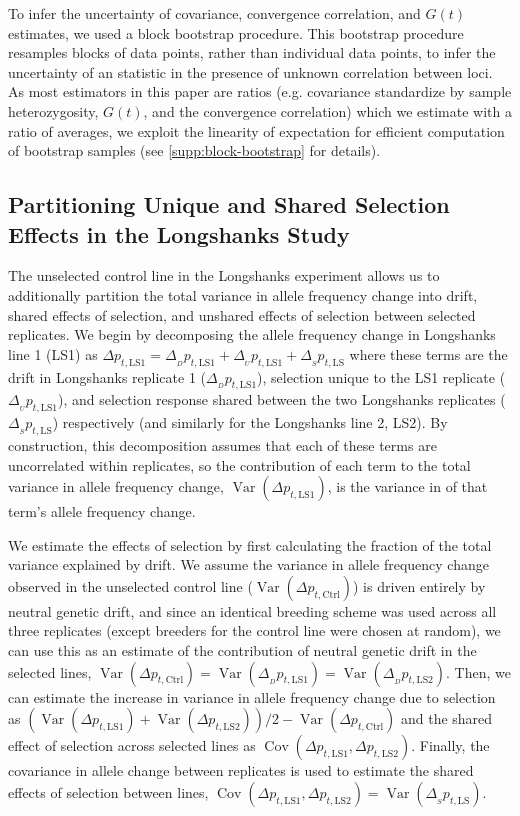 \documentclass[11pt]{article}
\DeclareMathOperator{\var}{Var}
\DeclareMathOperator{\cov}{Cov}
\begin{document}
To infer the uncertainty of covariance, convergence correlation, and $G(t)$
estimates, we used a block bootstrap procedure. This bootstrap procedure
resamples blocks of data points, rather than individual data points, to infer
the uncertainty of an statistic in the presence of unknown correlation between
loci. As most estimators in this paper are ratios (e.g. covariance standardize
by sample heterozygosity, $G(t)$, and the convergence correlation) which we
estimate with a ratio of averages, we exploit the linearity of expectation for
efficient computation of bootstrap samples (see \ref{supp:block-bootstrap} for
details).

\subsection{Partitioning Unique and Shared Selection Effects in the Longshanks Study}
\label{sec:mm-partition}

The unselected control line in the Longshanks experiment allows us to
additionally partition the total variance in allele frequency change into
drift, shared effects of selection, and unshared effects of selection between
selected replicates. We begin by decomposing the allele frequency change in
Longshanks line 1 (LS1) as $\Delta p_{t,\mathrm{LS1}} = \Delta_{_{D}}
p_{t,\mathrm{LS1}} + \Delta_{_{U}} p_{t,\mathrm{LS1}} + \Delta_{_S}
p_{t,\mathrm{LS}}$ where these terms are the drift in Longshanks replicate 1
($\Delta_{_D} p_{t,\mathrm{LS1}}$), selection unique to the LS1 replicate
($\Delta_{_U} p_{t,\mathrm{LS1}}$), and selection response shared between the
two Longshanks replicates ($\Delta_{_S} p_{t,\mathrm{LS}}$) respectively (and
similarly for the Longshanks line 2, LS2). By construction, this decomposition
assumes that each of these terms are uncorrelated within replicates, so the
contribution of each term to the total variance in allele frequency change,
$\var(\Delta p_{t,\mathrm{LS1}})$, is the variance in of that term's allele
frequency change. 

We estimate the effects of selection by first calculating the fraction of the
total variance explained by drift. We assume the variance in allele frequency
change observed in the unselected control line ($\var(\Delta
p_{t,\mathrm{Ctrl}})$) is driven entirely by neutral genetic drift, and since
an identical breeding scheme was used across all three replicates (except
breeders for the control line were chosen at random), we can use this as an
estimate of the contribution of neutral genetic drift in the selected lines,
$\var(\Delta p_{t,\mathrm{Ctrl}}) = \var(\Delta_{_{D}} p_{t,\mathrm{LS1}}) =
\var(\Delta_{_{D}} p_{t,\mathrm{LS2}})$. Then, we can estimate the increase in
variance in allele frequency change due to selection as $(\var(\Delta
p_{t,\mathrm{LS1}}) + \var(\Delta p_{t,\mathrm{LS2}}))/2 - \var(\Delta
p_{t,\mathrm{Ctrl}})$ and the shared effect of selection across selected lines
as $\cov(\Delta p_{t,\mathrm{LS1}}, \Delta p_{t,\mathrm{LS2}})$. Finally, the
covariance in allele change between replicates is used to estimate the shared
effects of selection between lines, $\cov(\Delta p_{t,\mathrm{LS1}}, \Delta
p_{t,\mathrm{LS2}}) = \var(\Delta_{_S} p_{t,\mathrm{LS}})$.
\end{document}

